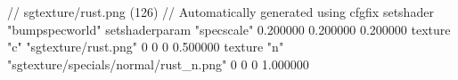 // sgtexture/rust.png (126)
// Automatically generated using cfgfix
setshader "bumpspecworld"
setshaderparam "specscale" 0.200000 0.200000 0.200000
texture "c" "sgtexture/rust.png" 0 0 0 0.500000
texture "n" "sgtexture/specials/normal/rust_n.png" 0 0 0 1.000000
